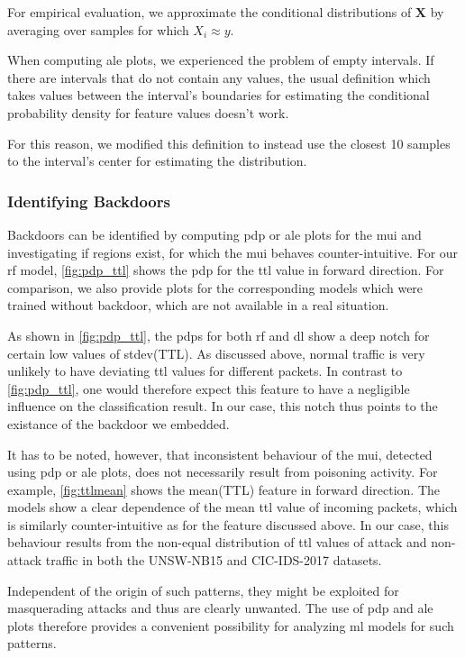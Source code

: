 \documentclass[10pt,sigconf,letterpaper,dvipsnames]{acmart}
\begin{document}
For empirical evaluation, we approximate the conditional distributions of $\boldsymbol X$ by averaging over samples for which $X_i \approx y$.

When computing \gls{ale} plots, we experienced the problem of empty intervals. If there are intervals  that do not contain any values, the usual definition which takes values between the interval's boundaries for estimating the conditional probability density for feature values doesn't work.

For this reason, we modified this definition to instead use the closest 10 samples to the interval's center for estimating the distribution.

\subsubsection{Identifying Backdoors}
Backdoors can be identified by computing \gls{pdp} or \gls{ale} plots for the \gls{mui} and investigating if regions exist, for which the \gls{mui} behaves counter-intuitive. For our \gls{rf} model, \autoref{fig:pdp_ttl} shows the \gls{pdp} for the \gls{ttl} value in forward direction. For comparison, we also provide plots for the corresponding models which were trained without backdoor, which are not available in a real situation.

As shown in \autoref{fig:pdp_ttl}, the \glspl{pdp} for both \gls{rf} and \gls{dl} show a deep notch for certain low values of stdev(TTL). As discussed above, normal traffic is very unlikely to have deviating \gls{ttl} values for different packets. In contrast to \autoref{fig:pdp_ttl}, one would therefore expect this feature to have a negligible influence on the classification result. In our case, this notch thus points to the existance of the backdoor we embedded.

It has to be noted, however, that inconsistent behaviour of the \gls{mui}, detected using \gls{pdp} or \gls{ale} plots, does not necessarily result from poisoning activity.  For example, \autoref{fig:ttlmean} shows the mean(TTL) feature in forward direction. The models show a clear dependence of the mean \gls{ttl} value of incoming packets, which is similarly counter-intuitive as for the feature discussed above. In our case, this behaviour results from the non-equal distribution of \gls{ttl} values of attack and non-attack traffic in both the UNSW-NB15 and CIC-IDS-2017 datasets. 

Independent of the origin of such patterns, they might be exploited for masquerading attacks and thus are clearly unwanted. The use of \gls{pdp} and \gls{ale} plots therefore provides a convenient possibility for analyzing \gls{ml} models for such patterns.
\end{document}
